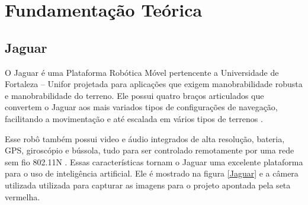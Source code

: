 \chapter{Fundamentação Teórica}
\label{cap:fundamentacao-teorica}

\section{Jaguar}
\label{sec:jaguar}

 O Jaguar é uma Plataforma Robótica Móvel pertencente a Universidade de Fortaleza – Unifor projetada para aplicações que exigem manobrabilidade robusta e manobrabilidade do terreno. Ele possui quatro braços articulados que convertem o Jaguar aos mais variados tipos de configurações de navegação, facilitando a movimentação e até escalada em vários tipos de terrenos \cite{jaguar}. 

Esse robô também possui video e áudio integrados de alta resolução, bateria, GPS, giroscópio e bússola, tudo para ser controlado remotamente por uma rede sem fio 802.11N \cite{jaguar}. 
Essas características tornam o Jaguar uma excelente plataforma para o uso de inteligência artificial. Ele é mostrado na figura \ref{Jaguar} e a câmera utilizada utilizada para capturar as imagens para o projeto apontada pela seta vermelha.

\begin{figure}[H]
	\centering
\end{figure}

